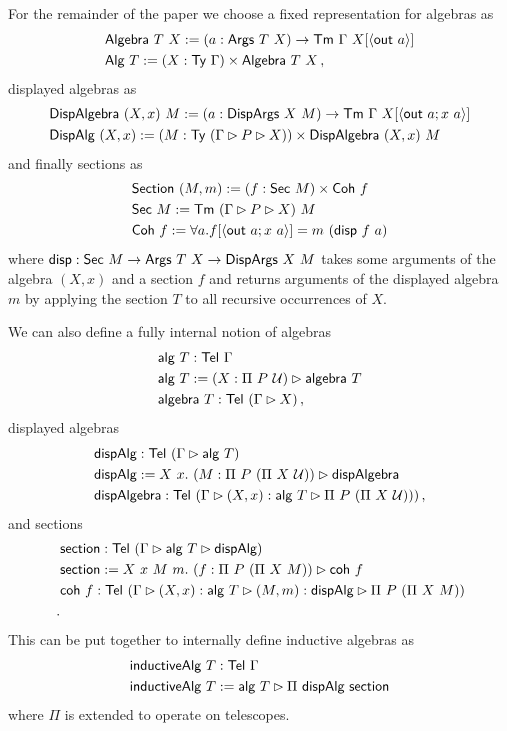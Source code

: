 For the remainder of the paper we choose a fixed representation for algebras as
\begin{align*}
    &\mta{Algebra}\ T\ X := (a : \mta{Args}\ T\ X) \to \Tm\ \Gamma\ X[\Msub{\mta{out}\ a}] \\
    &\mta{Alg}\ T := (X : \Ty\ \Gamma) \times \mta{Algebra}\ T\ X \,,
\end{align*}
displayed algebras as
\begin{align*}
    &\textsf{DispAlgebra}\ (X, x)\ M := (a : \textsf{DispArgs}\ X\ M) \to \textsf{Tm}\ \Gamma\ X[\langle\textsf{out}\ a; x\ a\rangle] \\
    &\textsf{DispAlg}\ (X, x) := (M : \textsf{Ty}\ (\Gamma \rhd P \rhd X)) \times \textsf{DispAlgebra}\ (X, x)\ M
\end{align*}
and finally sections as
\begin{align*}
    &\mta{Section}\ (M, m) := (f : \mta{Sec}\ M) \times \mta{Coh}\ f \\
    &\mta{Sec}\ M := \Tm\ (\Gamma \rhd P \rhd X)\ M \\
    &\mta{Coh}\ f := \forall a. f[\Msub{\mta{out}\ a; x\ a}] = m\ (\mta{disp}\ f\ a)
\end{align*}
where $\textsf{disp} : \textsf{Sec}\ M \to \textsf{Args}\ T\ X \to \textsf{DispArgs}\ X\ M$
takes some arguments of the algebra $(X, x)$ and a section $f$ and returns
arguments of the displayed algebra $m$ by applying the section $T$ to all
recursive occurrences of $X$.

We can also define a fully internal notion of algebras
\begin{align*}
    &\textsf{alg}\ T : \textsf{Tel}\ \Gamma \\
    &\textsf{alg}\ T := (X : \Pi\ P\ \mathcal{U}) \rhd \textsf{algebra}\ T \\
    &\textsf{algebra}\ T : \textsf{Tel}\ (\Gamma \rhd X) \,,
\end{align*}
displayed algebras
\begin{align*}
    &\textsf{dispAlg} : \textsf{Tel}\ (\Gamma \rhd \textsf{alg}\ T) \\
    &\textsf{dispAlg} := X\ x.\ (M : \Pi\ P\ (\Pi\ X\ \mathcal{U})) \rhd \textsf{dispAlgebra} \\
    &\textsf{dispAlgebra} : \textsf{Tel}\ (\Gamma \rhd (X, x) : \textsf{alg}\ T \rhd \Pi\ P\ (\Pi\ X\ \mathcal{U})))  \,,
\end{align*}
and sections
\begin{align*}
    &\textsf{section} : \textsf{Tel}\ (\Gamma \rhd \textsf{alg}\ T \rhd \textsf{dispAlg}) \\
    &\textsf{section} := X\ x\ M\ m.\ (f : \Pi\ P\ (\Pi\ X\ M)) \rhd \textsf{coh}\ f \\
    &\textsf{coh}\ f : \textsf{Tel}\ (\Gamma \rhd (X, x) : \textsf{alg}\ T\rhd (M, m) : \textsf{dispAlg} \rhd \Pi\ P\ (\Pi\ X\ M)) \\ \,.
\end{align*}
This can be put together to internally define inductive algebras as
\begin{align*}
    &\mta{inductiveAlg}\ T : \Tel\ \Gamma \\
    &\mta{inductiveAlg}\ T := \mta{alg}\ T \rhd \Pi\ \mta{dispAlg}\ \mta{section}
\end{align*}
where $\Pi$ is extended to operate on telescopes.

